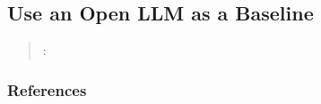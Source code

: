 



\subsection{Use an Open LLM as a Baseline}
\label{sec:use-an-open-llm-as-a-baseline}

\begin{quote}
\summary: 
\end{quote}



\subsubsection{References}





